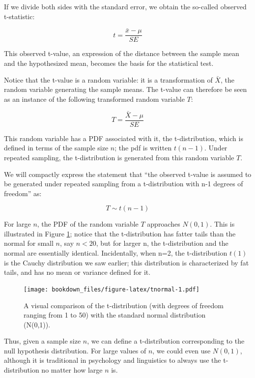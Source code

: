 \documentclass[12pt,]{krantz}
\begin{document}
If we divide both sides with the standard error, we obtain the so-called observed t-statistic:

\begin{equation}
t  = \frac{\bar{x} - \mu}{SE}
\end{equation}

This observed t-value, an expression of the distance between the sample mean and the hypothesized mean, becomes the basis for the statistical test.

Notice that the t-value is a random variable: it is a transformation of \(\bar{X}\), the random variable generating the sample means. The t-value can therefore be seen as an instance of the following transformed random variable \(T\):

\begin{equation}
T  = \frac{\bar{X} - \mu}{SE}
\end{equation}

This random variable has a PDF associated with it, the t-distribution, which is defined in terms of the sample size \(n\); the pdf is written \(t(n-1)\). Under repeated sampling, the t-distribution is generated from this random variable \(T\).

We will compactly express the statement that ``the observed t-value is assumed to be generated under repeated sampling from a t-distribution with n-1 degrees of freedom'' as:

\begin{equation}
T \sim t(n-1)
\end{equation}

For large \(n\), the PDF of the random variable \(T\) approaches \(N(0,1)\). This is illustrated in Figure \ref{fig:tnormal}; notice that the t-distribution has fatter tails than the normal for small \(n\), say \(n<20\), but for larger n, the t-distribution and the normal are essentially identical. Incidentally, when n=2, the t-distribution \(t(1)\) is the Cauchy distribution we saw earlier; this distribution is characterized by fat tails, and has no mean or variance defined for it.

\begin{figure}
\centering
\texttt{[image: bookdown\_files/figure-latex/tnormal-1.pdf]}
\caption{\label{fig:tnormal}A visual comparison of the t-distribution (with degrees of freedom ranging from 1 to 50) with the standard normal distribution (N(0,1)).}
\end{figure}

Thus, given a sample size \(n\), we can define a t-distribution corresponding to the null hypothesis distribution. For large values of \(n\), we could even use \(N(0,1)\), although it is traditional in psychology and linguistics to always use the t-distribution no matter how large \(n\) is.
\end{document}
